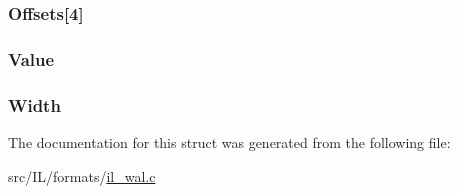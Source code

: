 \hypertarget{struct_w_a_l_h_e_a_d_acdaddbc51062dfc1e4081793cc0d305a}{
\subsubsection[{Offsets}]{ Offsets\mbox{[}4\mbox{]}}}\label{struct_w_a_l_h_e_a_d_acdaddbc51062dfc1e4081793cc0d305a}
\hypertarget{struct_w_a_l_h_e_a_d_aac3036f762179b99adefc20530a162aa}{
\subsubsection[{Value}]{ Value}}\label{struct_w_a_l_h_e_a_d_aac3036f762179b99adefc20530a162aa}
\hypertarget{struct_w_a_l_h_e_a_d_a4146e7b2b0b4097e0e335f9b348392bf}{
\subsubsection[{Width}]{ Width}}\label{struct_w_a_l_h_e_a_d_a4146e7b2b0b4097e0e335f9b348392bf}


The documentation for this struct was generated from the following file\-:\begin{DoxyCompactItemize}
\item 
src/\-I\-L/formats/\hyperlink{il__wal_8c}{il\-\_\-wal.\-c}\end{DoxyCompactItemize}
